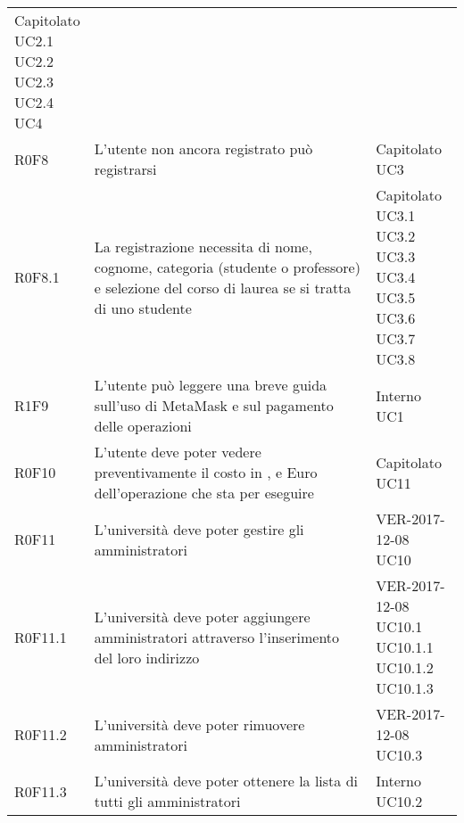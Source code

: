 \documentclass[AnalisiDeiRequisiti.tex]{subfiles}
\begin{document}
\begin{longtable}[H]{p{2cm}p{5.2cm}p{5cm}}
{		Capitolato \\ 
		UC2.1  \\
		UC2.2 \\
		UC2.3 \\
		UC2.4 \\ 
		UC4
	} \\
	R0F8 & L'utente non ancora registrato può registrarsi & \makecell[tl]{
		Capitolato \\ 
		UC3
	} \\
	R0F8.1 & La registrazione necessita di nome, cognome, categoria (studente o professore) e selezione del corso di laurea se si tratta di uno studente & \makecell[tl]{
		Capitolato \\
		UC3.1 \\
		UC3.2 \\
		UC3.3 \\
		UC3.4 \\
		UC3.5 \\
		UC3.6 \\
		UC3.7 \\
		UC3.8
	} \\
	R1F9 & L'utente può leggere una breve guida sull'uso di MetaMask e sul pagamento delle operazioni & \makecell[tl]{
		Interno \\ 
		UC1
	} \\
	R0F10 & L'utente deve poter vedere preventivamente il costo in \citGloss{Gas}, \citGloss{Ether} e Euro dell'operazione che sta per eseguire & \makecell[tl]{
		Capitolato \\
		UC11
	} \\
	R0F11 & L'università deve poter gestire gli amministratori & \makecell[tl]{
		VER-2017-12-08 \\
		UC10
	} \\
	R0F11.1 & L'università deve poter aggiungere amministratori attraverso l'inserimento del loro indirizzo & \makecell[tl]{
		VER-2017-12-08 \\
		UC10.1 \\
		UC10.1.1 \\ 
		UC10.1.2 \\
		UC10.1.3
	} \\
	R0F11.2 & L'università deve poter rimuovere amministratori & \makecell[tl]{
		VER-2017-12-08 \\
		UC10.3
	} \\
	R0F11.3 & L'università deve poter ottenere la lista di tutti gli amministratori & \makecell[tl]{
		Interno \\
		UC10.2
	} \\

\end{longtable}
\end{document}
